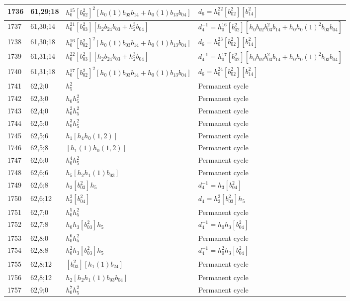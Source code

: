 \documentclass{article}
\begin{document}
\begin{longtable}{|l|l|>{\raggedright\arraybackslash}p{6cm}|>{\raggedright\arraybackslash}p{6cm}|}
\hline
1736 & 61,29;18 & $h_0^{15}[b_{02}^2]^2[h_0(1)b_{03}b_{14} + h_0(1)b_{13}b_{04}]$ &$d_{6}=h_0^{22}[b_{02}^2][b_{14}^2]$\\
\hline
1737 & 61,30;14 & $h_0^{21}[b_{03}^2][h_2b_{24}b_{03} + h_2^3b_{04}]$ & $d_{4}^{-1}=h_0^{16}[b_{02}^2][h_0b_{02}b_{03}^2b_{14} + h_0h_0(1)^2b_{03}b_{04}]$\\
\hline
1738 & 61,30;18 & $h_0^{16}[b_{02}^2]^2[h_0(1)b_{03}b_{14} + h_0(1)b_{13}b_{04}]$ &$d_{6}=h_0^{23}[b_{02}^2][b_{14}^2]$\\
\hline
1739 & 61,31;14 & $h_0^{22}[b_{03}^2][h_2b_{24}b_{03} + h_2^3b_{04}]$ & $d_{4}^{-1}=h_0^{17}[b_{02}^2][h_0b_{02}b_{03}^2b_{14} + h_0h_0(1)^2b_{03}b_{04}]$\\
\hline
1740 & 61,31;18 & $h_0^{17}[b_{02}^2]^2[h_0(1)b_{03}b_{14} + h_0(1)b_{13}b_{04}]$ &$d_{6}=h_0^{24}[b_{02}^2][b_{14}^2]$\\
\hline
1741 & 62,2;0 & $h_5^2$ & Permanent cycle\\
\hline
1742 & 62,3;0 & $h_0h_5^2$ & Permanent cycle\\
\hline
1743 & 62,4;0 & $h_0^2h_5^2$ & Permanent cycle\\
\hline
1744 & 62,5;0 & $h_0^3h_5^2$ & Permanent cycle\\
\hline
1745 & 62,5;6 & $h_1[h_4h_0(1, 2)]$ & Permanent cycle\\
\hline
1746 & 62,5;8 & $[h_1(1)h_0(1, 2)]$ & Permanent cycle\\
\hline
1747 & 62,6;0 & $h_0^4h_5^2$ & Permanent cycle\\
\hline
1748 & 62,6;6 & $h_5[h_2h_1(1)b_{03}]$ & Permanent cycle\\
\hline
1749 & 62,6;8 & $h_3[b_{03}^2]h_5$ & $d_{4}^{-1}=h_3[b_{04}^2]$\\
\hline
1750 & 62,6;12 & $h_2^2[b_{04}^2]$ &$d_{4}=h_2^2[b_{03}^2]h_5$\\
\hline
1751 & 62,7;0 & $h_0^5h_5^2$ & Permanent cycle\\
\hline
1752 & 62,7;8 & $h_0h_3[b_{03}^2]h_5$ & $d_{4}^{-1}=h_0h_3[b_{04}^2]$\\
\hline
1753 & 62,8;0 & $h_0^6h_5^2$ & Permanent cycle\\
\hline
1754 & 62,8;8 & $h_0^2h_3[b_{03}^2]h_5$ & $d_{4}^{-1}=h_0^2h_3[b_{04}^2]$\\
\hline
1755 & 62,8;12 & $[b_{03}^2][h_1(1)b_{24}]$ & Permanent cycle\\
1756 & 62,8;12 & $h_2[h_2h_1(1)b_{03}b_{04}]$ & Permanent cycle\\
\hline
1757 & 62,9;0 & $h_0^7h_5^2$ & Permanent cycle\\

\end{longtable}
\end{document}
